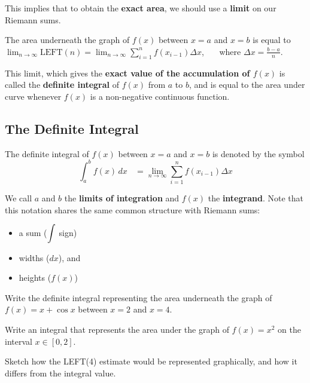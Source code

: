 This implies that to obtain the {\bf
  exact area}, we should use a {\bf limit} on our Riemann sums.

\medskip
\begin{center}
The area underneath the graph of $f(x)$ between $x=a$ and $x=b$ is equal to $\displaystyle\lim_{n \to \infty} \mbox{LEFT}(n) = 
\displaystyle\lim_{n \to \infty} \displaystyle\sum_{i=1}^{n} f(x_{i-1})\Delta x$, ~~~where $\Delta x = \displaystyle\frac{b-a}{n}$.
\end{center}

\newpage

This limit, which gives the {\bf exact value of the accumulation of
  $f(x)$} is called the {\bf definite integral} of $f(x)$ from $a$ to
$b$, and is equal to the area under curve whenever $f(x)$ is a
non-negative continuous function.

\newpage
{}
\subsection*{The Definite Integral}

  
  The definite integral of $f(x)$ between $x=a$ and $x=b$ is denoted
  by the symbol
  $$\int_a^b f(x) \,dx ~~~~= \lim_{n \to \infty}
  \displaystyle\sum_{i=1}^{n} f(x_{i-1})\Delta x$$

We call $a$ and $b$ the
  {\bf{limits of integration}} and $f(x)$ the {\bf{integrand}}.  Note
  that this notation shares the same common structure with Riemann
  sums:
\begin{itemize}
\item a sum ($\displaystyle \int $ sign) \\
\item widths ($dx$), and \\
\item heights ($f(x)$)
\end{itemize}

\newpage 

\problem Write the definite integral representing the area underneath
  the graph of $f(x) = x + \cos x$ between $x=2$ and $x=4$.

\vfill

\newpage
\problem Write an integral that represents the area under the graph of
$f(x) = x^2$ on the interval $x \in [0, 2]$.

\vfill \problem Sketch how the LEFT(4) estimate would be represented
graphically, and how it differs from the integral value.

